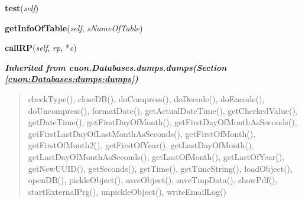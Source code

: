     \vspace{0.5ex}

\hspace{.8\funcindent}\begin{boxedminipage}{\funcwidth}

    \raggedright \textbf{test}(\textit{self})

\setlength{\parskip}{2ex}
\setlength{\parskip}{1ex}
    \end{boxedminipage}

    \label{cuon:XMLRPC:xmlrpc:myXmlRpc:getInfoOfTable}

    \vspace{0.5ex}

\hspace{.8\funcindent}\begin{boxedminipage}{\funcwidth}

    \raggedright \textbf{getInfoOfTable}(\textit{self}, \textit{sNameOfTable})

\setlength{\parskip}{2ex}
\setlength{\parskip}{1ex}
    \end{boxedminipage}

    \label{cuon:XMLRPC:xmlrpc:myXmlRpc:callRP}

    \vspace{0.5ex}

\hspace{.8\funcindent}\begin{boxedminipage}{\funcwidth}

    \raggedright \textbf{callRP}(\textit{self}, \textit{rp}, *\textit{c})

\setlength{\parskip}{2ex}
\setlength{\parskip}{1ex}
    \end{boxedminipage}


\large{\textbf{\textit{Inherited from cuon.Databases.dumps.dumps\textit{(Section \ref{cuon:Databases:dumps:dumps})}}}}

\begin{quote}
checkType(), closeDB(), doCompress(), doDecode(), doEncode(), doUncompress(), formatDate(), getActualDateTime(), getCheckedValue(), getDateTime(), getFirstDayOfMonth(), getFirstDayOfMonthAsSeconds(), getFirstLastDayOfLastMonthAsSeconds(), getFirstOfMonth(), getFirstOfMonth2(), getFirstOfYear(), getLastDayOfMonth(), getLastDayOfMonthAsSeconds(), getLastOfMonth(), getLastOfYear(), getNewUUID(), getSeconds(), getTime(), getTimeString(), loadObject(), openDB(), pickleObject(), saveObject(), saveTmpData(), showPdf(), startExternalPrg(), unpickleObject(), writeEmailLog()
\end{quote}

